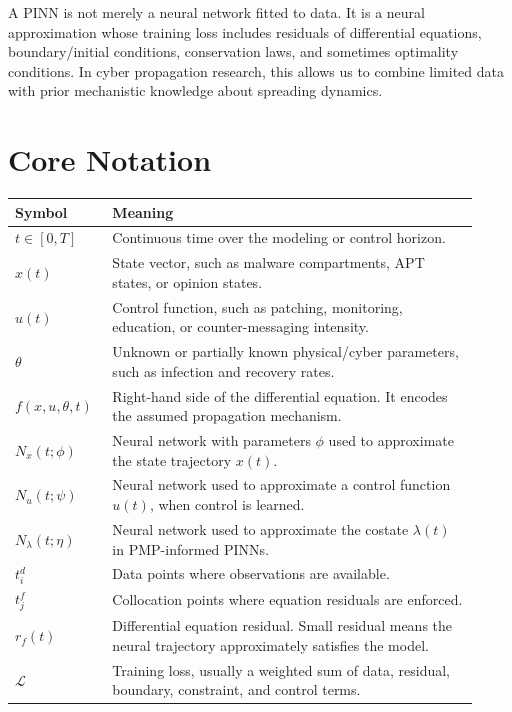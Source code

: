 \documentclass[11pt,a4paper]{article}
\begin{document}
\begin{takeaway}
A PINN is not merely a neural network fitted to data. It is a neural approximation whose training loss includes residuals of differential equations, boundary/initial conditions, conservation laws, and sometimes optimality conditions. In cyber propagation research, this allows us to combine limited data with prior mechanistic knowledge about spreading dynamics.

\end{takeaway}

\section*{Core Notation}
\begin{longtable}{p{0.18\linewidth}p{0.74\linewidth}}
\toprule
Symbol & Meaning \\
\midrule
$t\in[0,T]$ & Continuous time over the modeling or control horizon. \\
$x(t)$ & State vector, such as malware compartments, APT states, or opinion states. \\
$u(t)$ & Control function, such as patching, monitoring, education, or counter-messaging intensity. \\
$\theta$ & Unknown or partially known physical/cyber parameters, such as infection and recovery rates. \\
$f(x,u,\theta,t)$ & Right-hand side of the differential equation. It encodes the assumed propagation mechanism. \\
$N_x(t;\phi)$ & Neural network with parameters $\phi$ used to approximate the state trajectory $x(t)$. \\
$N_u(t;\psi)$ & Neural network used to approximate a control function $u(t)$, when control is learned. \\
$N_\lambda(t;\eta)$ & Neural network used to approximate the costate $\lambda(t)$ in PMP-informed PINNs. \\
$t_i^d$ & Data points where observations are available. \\
$t_j^f$ & Collocation points where equation residuals are enforced. \\
$r_f(t)$ & Differential equation residual. Small residual means the neural trajectory approximately satisfies the model. \\
$\mathcal{L}$ & Training loss, usually a weighted sum of data, residual, boundary, constraint, and control terms. \\
\bottomrule
\end{longtable}
\end{document}
